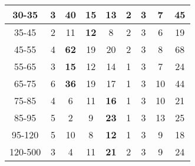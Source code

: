 \begin{frame}
\begin{table}[h]
\begin{center}
\begin{tabular}{|c|c|c|c|c|c|c|c|c|}
    30-35 & 3 & {\color{blue}\bfseries{40}} & 15 & 13 & 2 & 3 & 7 & 45 \\ \hline
    35-45 & 2 & 11 & {\color{blue}\bfseries{12}} & 8 & 2 & 3 & 6 & 19 \\ \hline
    45-55 & 4 & {\color{blue}\bfseries{62}} & 19 & 20 & 2 & 3 & 8 & 68 \\ \hline
    55-65 & 3 & {\color{blue}\bfseries{15}} & 12 & 14 & 1 & 3 & 7 & 24 \\ \hline
    65-75 & 6 & {\color{blue}\bfseries{36}} & 19 & 17 & 1 & 3 & 10 & 44 \\ \hline
    75-85 & 4 & 6 & 11 & {\color{blue}\bfseries{16}} & 1 & 3 & 10 & 21 \\ \hline
    85-95 & 5 & 2 & 9 & {\color{blue}\bfseries{23}} & 1 & 3 & 13 & 25 \\ \hline
    95-120 & 5 & 10 & 8 & {\color{blue}\bfseries{12}} & 1 & 3 & 9 & 18 \\ \hline
    120-500 & 3 & 4 & 11 & {\color{blue}\bfseries{21}} & 2 & 3 & 9 & 24 \\ \hline
  \end{tabular}
  \label{tab:systInPercent_MUON_WGamma}
  \end{center}
\end{table}
\end{frame}%

